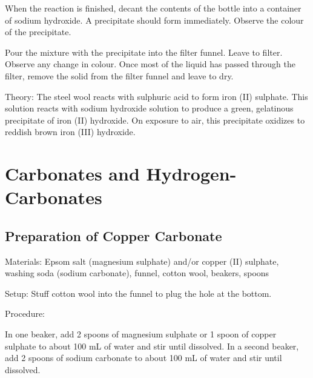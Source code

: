 \begin{multicols}{2}
\begin{description*}
{When the reaction is finished, decant the contents of the bottle into a container of sodium hydroxide. A precipitate should form immediately. Observe the colour of the precipitate.

Pour the mixture with the precipitate into the filter funnel. Leave to
filter. Observe any change in colour. Once most of the liquid has passed through the filter, remove the solid from the filter funnel and leave to dry.}
\item[Theory:]{The steel wool reacts with sulphuric acid to form iron (II) sulphate. This
solution reacts with sodium hydroxide solution to produce a green, gelatinous precipitate of iron (II) hydroxide. On exposure to air, this precipitate
oxidizes to reddish brown iron (III) hydroxide.}
\end{description*}


\section*{Carbonates and Hydrogen-Carbonates}




\subsection{Preparation of Copper Carbonate}


\begin{description*}
\item[Materials:]{Epsom salt (magnesium sulphate) and/or copper (II) sulphate, washing
soda (sodium carbonate), funnel, cotton wool, beakers, spoons}
\item[Setup:]{Stuff cotton wool into the funnel to plug the hole at the bottom.}
\item[Procedure:]{In one beaker, add 2 spoons of magnesium sulphate or 1 spoon of
copper sulphate to about 100 mL of water and stir until dissolved.
In a second beaker, add 2 spoons of sodium carbonate to about 100
mL of water and stir until dissolved. 

}
\end{description*}
\end{multicols}
